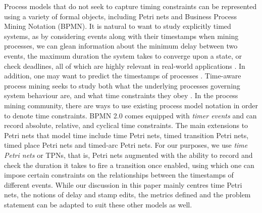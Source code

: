 \documentclass[conference]{IEEEtran}
\begin{document}
    
    Process models that do not seek to capture timing constraints can be represented using a variety of formal objects, including Petri nets and Business Process Mining Notation (BPMN).
    It is natural to want to study explicitly timed systems,  as by considering events along with their timestamps when mining processes, we can glean information about the minimum delay between two events, the maximum duration the system takes to converge upon a state, or check deadlines, all of which are highly relevant in real-world applications \cite{Cheikhrouhou2014TheTP} \cite{Eder1999TimeCI} \cite{inbook}. 
    In addition, one may want to predict the timestamps of processes \cite{SSA11}. 
    Time-aware process mining seeks to study both what the underlying processes governing system behaviour are, and what time constraints they obey \cite{RMAW13} \cite{CRHA20}  \cite{AS21}. 
    In the process mining community, there are ways to use existing process model notation in order to denote time constraints. BPMN 2.0 comes equipped with \emph{timer events} and can record absolute, relative, and cyclical time constraints. 
    The main extensions to Petri nets that model time include time Petri nets, timed transition Petri nets, timed place Petri nets and timed-arc Petri nets. 
    For our purposes, we use \textit{time Petri nets} or TPNs, that is, Petri nets augmented with the ability to record and check the duration it takes to fire a transition once enabled, using which one can impose certain constraints on the relationships between the timestamps of different events. 
    While our discussion in this paper mainly centres time Petri nets, the notions of delay and stamp edits, the metrics defined and the problem statement can be adapted to suit these other models as well. 
    
\end{document}
